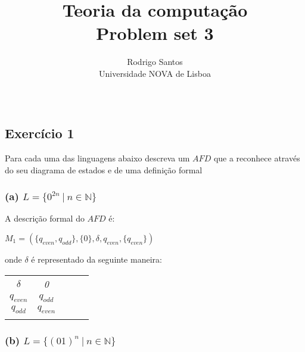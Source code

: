 \documentclass{article}
\title{Teoria da computação \large \\ Problem set 3}
\author{Rodrigo Santos\\
  \small Universidade NOVA de Lisboa\\\\
}
\date{\vspace{-5ex}}
\begin{document}
\maketitle
\subsection*{Exercício 1}
Para cada uma das linguagens abaixo descreva um $AFD$ que a reconhece através do seu diagrama de estados e de uma definição formal

\subsubsection*{(a) $L = \{0^{2n} \ | \ n \in \mathbb{N}\}$}

\begin{center}
\end{center}

A descrição formal do $AFD$ é:
\begin{center}
  $M_1 = (\{q_{even},q_{odd}\}, \{0\},\delta,q_{even}, \{q_{even}\})$
\end{center}
onde $\delta$ é representado da seguinte maneira:
\begin{table}[htbp]
  \centering
  \begin{tabular}{cclll}
    \multicolumn{1}{c|}{\textit{$\delta$}}   & \textit{0}                    & \textit{} & \textit{} & \textit{} \\ \cline{1-2}
    \multicolumn{1}{c|}{\textit{$q_{even}$}} & \textit{$q_{odd}$}            & \textit{} & \textit{} & \textit{} \\
    \multicolumn{1}{c|}{\textit{$q_{odd}$}}  & \textit{$q_{even}$}           & \textit{} & \textit{} & \textit{} \\
    \multicolumn{1}{l}{\textit{}}            & \multicolumn{1}{l}{\textit{}} & \textit{} & \textit{} & \textit{}
  \end{tabular}
\end{table}

\subsubsection*{(b) $L = \{(01)^n \ | \ n \in \mathbb{N}\}$}
\end{document}
